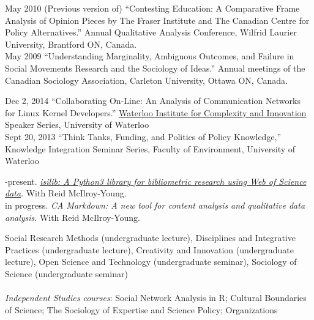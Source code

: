 \documentclass[9pt,usenames,dvipsnames]{article}
\begin{document}
\ind May 2010 (Previous version of) ``Contesting Education: A Comparative Frame Analysis of Opinion Pieces by The Fraser Institute and The Canadian Centre for Policy Alternatives.'' Annual Qualitative Analysis Conference, Wilfrid Laurier University, Brantford ON, Canada.\\

\ind May 2009 ``Understanding Marginality, Ambiguous Outcomes, and Failure in Social Movements Research and the Sociology of Ideas.'' Annual meetings of the Canadian Sociology Association, Carleton University, Ottawa ON, Canada.\\


\ind Dec 2, 2014 ``Collaborating On-Line: An Analysis of Communication Networks for Linux Kernel Developers.'' \href{http://wici.ca/}{Waterloo Institute for Complexity and Innovation} Speaker Series, University of Waterloo \\


\ind Sept 20, 2013 ``Think Tanks, Funding, and Politics of Policy Knowledge,'' Knowledge Integration Seminar Series, Faculty of Environment, University of Waterloo \\


-present. \href{http://networkslab.org/isilib/}{\emph{isilib: A Python3 library for bibliometric research using Web of Science data}}. With Reid McIlroy-Young. \\

\ind in progress. \emph{CA Markdown: A new tool for content analysis and qualitative data analysis}. With Reid McIlroy-Young. \\


\noindent Social Research Methods (undergraduate lecture), Disciplines and Integrative Practices (undergraduate lecture), Creativity and Innovation (undergraduate lecture), Open Science and Technology (undergraduate seminar), Sociology of Science (undergraduate seminar) \\
\\
\noindent \emph{Independent Studies courses}: Social Network Analysis in R; Cultural Boundaries of Science; The Sociology of Expertise and Science Policy; Organizations \\ %
\\
\end{document}
